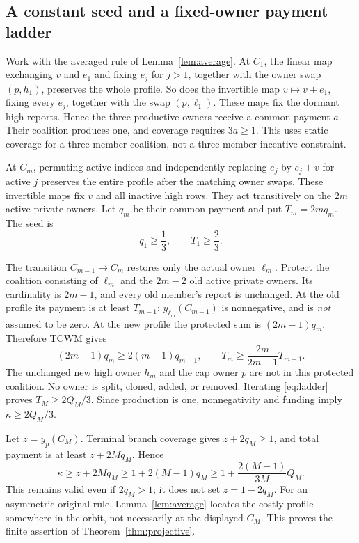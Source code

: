 \subsection{A constant seed and a fixed-owner payment ladder}
Work with the averaged rule of Lemma~\ref{lem:average}. At $C_1$, the linear
map exchanging $v$ and $e_1$ and fixing $e_j$ for $j>1$, together with the
owner swap $(p,h_1)$, preserves the whole profile. So does the invertible map
$v\mapsto v+e_1$, fixing every $e_j$, together with the swap $(p,\ell_1)$.
These maps fix the dormant high reports. Hence the three productive owners
receive a common payment $a$. Their coalition produces one, and coverage
requires $3a\ge1$. This uses static coverage for a three-member coalition,
not a three-member incentive constraint.

At $C_m$, permuting active indices and independently replacing
$e_j$ by $e_j+v$ for active $j$ preserves the entire profile after the matching
owner swaps. These invertible maps fix $v$ and all inactive high rows.
They act transitively on the $2m$ active private owners. Let $q_m$ be their
common payment and put $T_m=2m q_m$. The seed is
\begin{equation}\label{eq:seed}
 q_1\ge\frac13,\qquad T_1\ge\frac23.
\end{equation}

The transition $C_{m-1}\to C_m$ restores only the actual owner $\ell_m$.
Protect the coalition consisting of $\ell_m$ and the $2m-2$ old active
private owners. Its cardinality is $2m-1$, and every old member's report
is unchanged. At the old profile its payment is at least $T_{m-1}$:
$y_{\ell_m}(C_{m-1})$ is nonnegative, and is \emph{not} assumed to be zero.
At the new profile the protected sum is $(2m-1)q_m$. Therefore TCWM gives
\begin{equation}\label{eq:ladder}
 (2m-1)q_m\ge2(m-1)q_{m-1},\qquad
 T_m\ge\frac{2m}{2m-1}T_{m-1}.
\end{equation}
The unchanged new high owner $h_m$ and the cap owner $p$ are not in this
protected coalition. No owner is split, cloned, added, or removed.
Iterating \eqref{eq:ladder} proves $T_M\ge2Q_M/3$. Since production is one,
nonnegativity and funding imply $\kappa\ge2Q_M/3$.

Let $z=y_p(C_M)$. Terminal branch coverage gives $z+2q_M\ge1$, and total
payment is at least $z+2M q_M$. Hence
\[
 \kappa\ge z+2M q_M\ge1+2(M-1)q_M
 \ge1+\frac{2(M-1)}{3M}Q_M.
\]
This remains valid even if $2q_M>1$; it does not set $z=1-2q_M$.
For an asymmetric original rule, Lemma~\ref{lem:average} locates the costly
profile somewhere in the orbit, not necessarily at the displayed $C_M$.
This proves the finite assertion of Theorem~\ref{thm:projective}.

